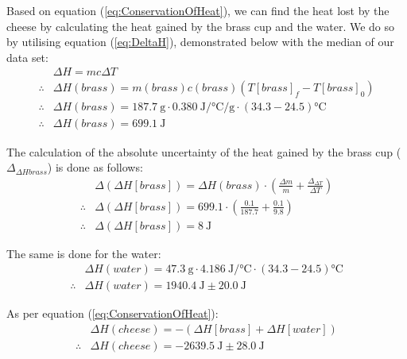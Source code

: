 Based on equation (\ref{eq:ConservationOfHeat}), we can find the heat lost by the cheese by calculating the heat gained by the brass cup and the water. We do so by utilising equation (\ref{eq:DeltaH}), demonstrated below with the median of our data set:
\begin{equation}
\begin{split}
    &\Delta H = mc\Delta T \\
    \therefore &\Delta H(brass) = m(brass)c(brass)( {T[brass]}_f - {T[brass]}_0 ) \\
    \therefore &\Delta H(brass) = \SI{187.7}{\gram} \cdot \SI{0.380}{\joule\per\celsius\per\gram} \cdot (34.3 - 24.5) \si{\celsius} \\
    \therefore &\Delta H(brass) = \SI{699.1}{\joule}
\end{split}
\end{equation}

The calculation of the absolute uncertainty of the heat gained by the brass cup ($\Delta {}_{\Delta Hbrass}$) is done as follows:
\begin{equation}
\begin{split}
    &\Delta(\Delta H[brass]) = \Delta H(brass) \cdot \left ( \frac{\Delta m}{m} + \frac{\Delta_{\Delta T}}{\Delta T} \right )\\
    \therefore &\Delta(\Delta H[brass]) = 699.1 \cdot \left ( \frac{0.1}{187.7} + \frac{0.1}{9.8} \right ) \\
    \therefore & \Delta(\Delta H[brass]) = \SI{8}{\joule}
\end{split}
\end{equation}

The same is done for the water:
\begin{equation}
\begin{split}
    &\Delta H(water) = \SI{47.3}{\gram} \cdot \SI{4.186}{\joule\per\celsius} \cdot (34.3 - 24.5) \si{\celsius} \\
    \therefore &\Delta H(water) = \SI{1940.4}{\joule} \pm \SI{20.0}{\joule}
\end{split}
\end{equation}

As per equation (\ref{eq:ConservationOfHeat}):
\begin{equation}
\begin{split}
    &\Delta H(cheese) = -(\Delta H[brass] + \Delta H[water]) \\
    \therefore &\Delta H(cheese) = -\SI{2639.5}{\joule} \pm \SI{28.0}{\joule}
\end{split}
\end{equation}

